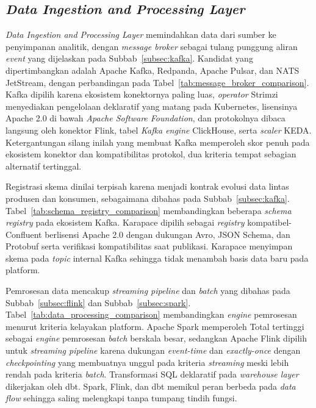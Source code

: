 

\subsection{\textit{Data Ingestion and Processing Layer}}
\label{subsec:pilih-ingestasi}

\textit{Data Ingestion and Processing Layer} memindahkan data dari sumber ke penyimpanan analitik, dengan \textit{message broker} sebagai tulang punggung aliran \textit{event} yang dijelaskan pada Subbab~\ref{subsec:kafka}. Kandidat yang dipertimbangkan adalah Apache Kafka, Redpanda, Apache Pulsar, dan NATS JetStream, dengan perbandingan pada Tabel~\ref{tab:message_broker_comparison}. Kafka dipilih karena ekosistem konektornya paling luas, \textit{operator} Strimzi menyediakan pengelolaan deklaratif yang matang pada Kubernetes, lisensinya Apache 2.0 di bawah \textit{Apache Software Foundation}, dan protokolnya dibaca langsung oleh konektor Flink, tabel \textit{Kafka engine} ClickHouse, serta \textit{scaler} KEDA. Ketergantungan silang inilah yang membuat Kafka memperoleh skor penuh pada ekosistem konektor dan kompatibilitas protokol, dua kriteria tempat sebagian alternatif tertinggal.



Registrasi skema dinilai terpisah karena menjadi kontrak evolusi data lintas produsen dan konsumen, sebagaimana dibahas pada Subbab~\ref{subsec:kafka}. Tabel~\ref{tab:schema_registry_comparison} membandingkan beberapa \textit{schema registry} pada ekosistem Kafka. Karapace dipilih sebagai \textit{registry} kompatibel-Confluent berlisensi Apache 2.0 dengan dukungan Avro, JSON Schema, dan Protobuf serta verifikasi kompatibilitas saat publikasi. Karapace menyimpan skema pada \textit{topic} internal Kafka sehingga tidak menambah basis data baru pada platform.



Pemrosesan data mencakup \textit{streaming pipeline} dan \textit{batch} yang dibahas pada Subbab~\ref{subsec:flink} dan Subbab~\ref{subsec:spark}. Tabel~\ref{tab:data_processing_comparison} membandingkan \textit{engine} pemrosesan menurut kriteria kelayakan platform. Apache Spark memperoleh Total tertinggi sebagai \textit{engine} pemrosesan \textit{batch} berskala besar, sedangkan Apache Flink dipilih untuk \textit{streaming pipeline} karena dukungan \textit{event-time} dan \textit{exactly-once} dengan \textit{checkpointing} yang membuatnya unggul pada kriteria \textit{streaming} meski lebih rendah pada kriteria \textit{batch}. Transformasi SQL deklaratif pada \textit{warehouse layer} dikerjakan oleh dbt. Spark, Flink, dan dbt memikul peran berbeda pada \textit{data flow} sehingga saling melengkapi tanpa tumpang tindih fungsi.

